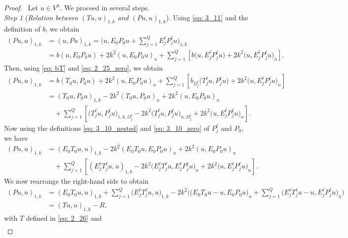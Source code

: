\documentclass[numbers,webpdf,imaiai]{ima-authoring-template}%
\theoremstyle{thmstyletwo}%
\numberwithin{equation}{section}
\numberwithin{equation}{section}
\begin{document}
{\begin{proof}\,
Let $u \in V^h$.  We proceed in several steps.
\\[1ex]
\textit{Step 1} (\textit{Relation between $(Tu,u)_{1,k}$ and $(Pu,u)_{1,k}$}). 
Using \eqref{eq: 3_11} and the definition of $b$, we obtain
\begin{align*}
	(Pu,u)_{1,k} & {= (u, Pu)_{1,k}}  
	= \biggl(u,E_0 P_0u + \sum^{Q}_{j=1} E^{\ell}_j P^{\ell}_j u\biggr)_{1,k}
	\\
	&=  b(u,E_0 P_0u) + 2k^2(u,E_0 P_0u)_n 
	+ \sum^{Q}_{j=1} \left[ b\bigl(u, E^{\ell}_j P^{\ell}_j u\bigr) + 2k^2\bigl(u,E^{\ell}_j P^{\ell}_j u\bigr)_n \right].
\end{align*}
Then, using \eqref{eq: bT} and \eqref{eq: 2_25_zero}, we obtain   
\begin{align*}
	(Pu,u)_{1,k} &= b(T_0 u,P_0u) + 2k^2(u,E_0 P_0u)_n 
	+ \sum^{Q}_{j=1} \left[ b_{\Omega^{\ell}_j}\bigl(T^{\ell}_j u, P^{\ell}_j u\bigr) + 2k^2\bigl(u,E^{\ell}_j P^{\ell}_j u\bigr)_n \right]
	\\[0.5ex]
	&= (T_0 u,P_0u)_{1,k} - 2k^2(T_0 u,P_0u)_n + 2k^2(u,E_0 P_0u)_n 
	\\[0.5ex] 
	&\quad + \sum^{Q}_{j=1} \left[ \bigl(T^{\ell}_j u, P^{\ell}_j u\bigr)_{1,k,\Omega^{\ell}_j} 
	- 2k^2\bigl(T^{\ell}_j u, {P^{\ell}_j} u\bigr)_{n,\Omega^{\ell}_j} + 2k^2\bigl(u,E^{\ell}_j P^{\ell}_j u\bigr)_n \right].
\end{align*}
Now using the definitions \eqref{eq: 3_10_nested} and \eqref{eq: 3_10_zero} of $P_j^\ell$ and $P_0$, 
we have 
\begin{align*}
  	(Pu,u)_{1,k} 
	&= (E_0 T_0 u,u)_{1,k} - 2k^2(E_0 T_0 u,E_0 P_0u)_n + 2k^2(u,E_0 P_0u)_n 
	\\[0.5ex]
	&\quad + \sum^{Q}_{j=1} \left[ (E^{\ell}_j T^{\ell}_j u, u)_{1,k} 
	- 2k^2\bigl(E^{\ell}_j T^{\ell}_j u, E^{\ell}_j P^{\ell}_j u\bigr)_n + 2k^2\bigl(u,E^{\ell}_j P^{\ell}_j u\bigr)_n \right]. 
\end{align*}
We now rearrange the right-hand side to obtain
\begin{align}
	(Pu,u)_{1,k} &= (E_0 T_0 u,u)_{1,k} + \sum^{Q}_{j=1} \bigl(E^{\ell}_j T^{\ell}_j u, u\bigr)_{1,k} 
	- 2k^2 \biggl(\bigl(E_0 T_0 u - u,E_0 P_0u\bigr)_n 
	+ \sum^{Q}_{j=1} \bigl(E^{\ell}_j T^{\ell}_j u - u, E^{\ell}_j P^{\ell}_j u\bigr)_n \biggr)
    \nonumber\\[0.5ex]
    &= (T u, u)_{1,k} - R, 
    \label{relation}
\end{align}
with $T$ defined in \eqref{eq: 2_26} and
\begin{align}\label{defR}

\end{align}
\end{proof}}
\end{document}
